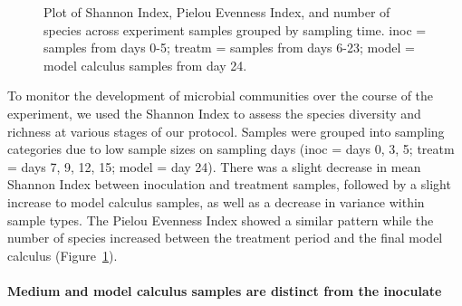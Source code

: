 \documentclass[10pt,a4paper]{article}
\begin{document}
\begin{figure}


\caption{\label{fig-diversity-byoc}Plot of Shannon Index, Pielou
Evenness Index, and number of species across experiment samples grouped
by sampling time. inoc = samples from days 0-5; treatm = samples from
days 6-23; model = model calculus samples from day 24.}

\end{figure}%

To monitor the development of microbial communities over the course of
the experiment, we used the Shannon Index to assess the species
diversity and richness at various stages of our protocol. Samples were
grouped into sampling categories due to low sample sizes on sampling
days (inoc = days 0, 3, 5; treatm = days 7, 9, 12, 15; model = day 24).
There was a slight decrease in mean Shannon Index between inoculation
and treatment samples, followed by a slight increase to model calculus
samples, as well as a decrease in variance within sample types. The
Pielou Evenness Index showed a similar pattern while the number of
species increased between the treatment period and the final model
calculus (Figure~\ref{fig-diversity-byoc}).

\paragraph{Medium and model calculus samples are distinct from the
inoculate}\label{medium-and-model-calculus-samples-are-distinct-from-the-inoculate}
\end{document}
